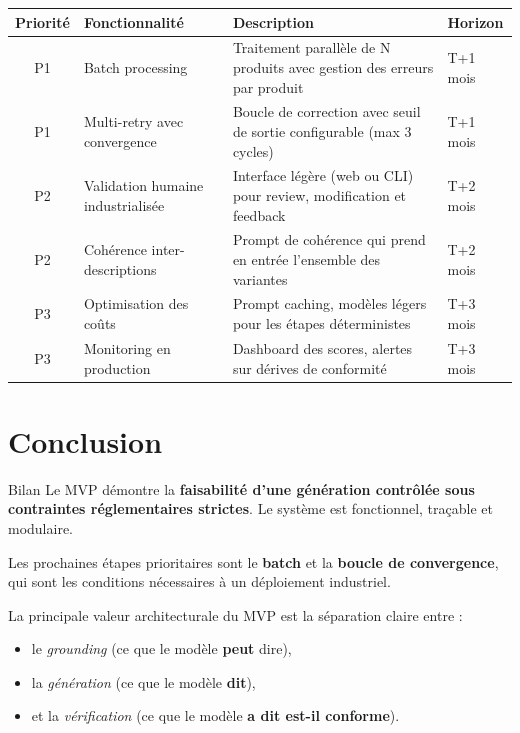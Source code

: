 \documentclass[11pt,a4paper]{article}
\begin{document}
\begin{center}
\renewcommand{\arraystretch}{1.3}
\begin{tabularx}{\linewidth}{clXl}
\toprule
\textbf{Priorité} & \textbf{Fonctionnalité} & \textbf{Description} & \textbf{Horizon} \\
\midrule
P1 & Batch processing &
  Traitement parallèle de N produits avec gestion des erreurs par produit &
  T+1 mois \\
P1 & Multi-retry avec convergence &
  Boucle de correction avec seuil de sortie configurable (max 3 cycles) &
  T+1 mois \\
P2 & Validation humaine industrialisée &
  Interface légère (web ou CLI) pour review, modification et feedback &
  T+2 mois \\
P2 & Cohérence inter-descriptions &
  Prompt de cohérence qui prend en entrée l'ensemble des variantes &
  T+2 mois \\
P3 & Optimisation des coûts &
  Prompt caching, modèles légers pour les étapes déterministes &
  T+3 mois \\
P3 & Monitoring en production &
  Dashboard des scores, alertes sur dérives de conformité &
  T+3 mois \\
\bottomrule
\end{tabularx}
\end{center}

\section{Conclusion}

\begin{okbox}{Bilan}
Le MVP démontre la \textbf{faisabilité d'une génération contrôlée sous contraintes
réglementaires strictes}. Le système est fonctionnel, traçable et modulaire.

Les prochaines étapes prioritaires sont le \textbf{batch} et la \textbf{boucle de convergence},
qui sont les conditions nécessaires à un déploiement industriel.
\end{okbox}

\vspace{0.5em}

La principale valeur architecturale du MVP est la séparation claire entre :
\begin{itemize}[leftmargin=1.5em]
  \item le \textit{grounding} (ce que le modèle \textbf{peut} dire),
  \item la \textit{génération} (ce que le modèle \textbf{dit}),
  \item et la \textit{vérification} (ce que le modèle \textbf{a dit est-il conforme}).
\end{itemize}
\end{document}
